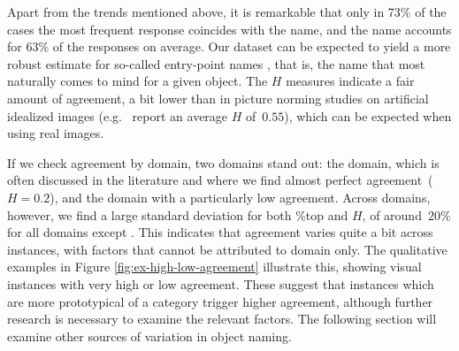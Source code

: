 Apart from the trends mentioned above, it is remarkable that only in 73\% of the cases the most frequent response coincides with the \vg name, and the \vg name accounts for 63\% of the responses on average.
Our dataset can be expected to yield a more robust estimate for so-called entry-point names \cite{jolicoeur1984pictures}, that is, the name that most naturally comes to mind for a given object.
The $H$ measures indicate a fair amount of agreement, a bit lower than in picture norming studies on artificial idealized images (e.g.\  report an average $H$ of\ $0.55$), which can be expected when using real images.

If we check agreement by domain, two domains stand out: the  domain, which is often discussed in the literature and where we find almost perfect agreement\ (\mbox{$H=0.2$}), and the  domain with a particularly low agreement.
Across domains, however, we find a large standard deviation for both \%top and $H$, of around\ $20\%$ for all domains except .
This indicates that agreement varies quite a bit across instances, with factors that cannot be attributed to domain only.
The qualitative examples in Figure \ref{fig:ex-high-low-agreement} illustrate this, showing visual instances with very high or low agreement.
These suggest that instances which are more prototypical of a category trigger higher agreement, although further research is necessary to examine the relevant factors.
The following section will examine other sources of variation in object naming.

